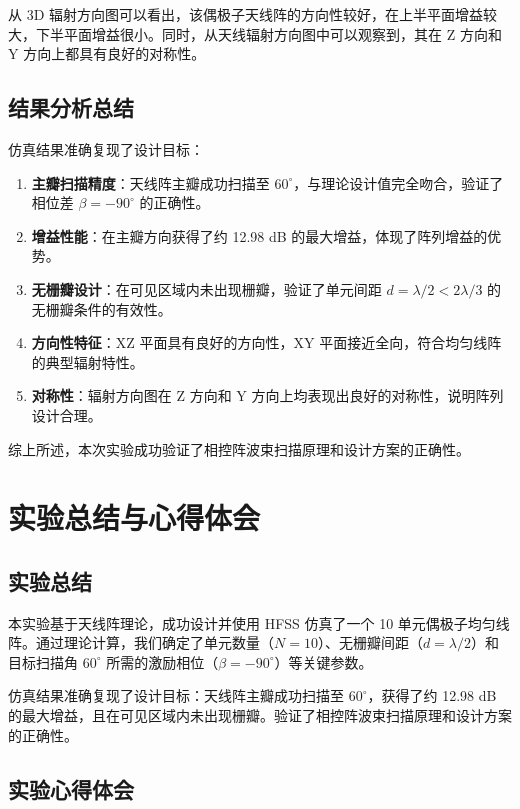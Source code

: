 \documentclass[12pt,a4paper,UTF8]{article}
\begin{document}
从 3D 辐射方向图可以看出，该偶极子天线阵的方向性较好，在上半平面增益较大，下半平面增益很小。同时，从天线辐射方向图中可以观察到，其在 Z 方向和 Y 方向上都具有良好的对称性。

\subsection{结果分析总结}

仿真结果准确复现了设计目标：

\begin{enumerate}
\item \textbf{主瓣扫描精度}：天线阵主瓣成功扫描至 $60^\circ$，与理论设计值完全吻合，验证了相位差 $\beta = -90^\circ$ 的正确性。

\item \textbf{增益性能}：在主瓣方向获得了约 12.98 dB 的最大增益，体现了阵列增益的优势。

\item \textbf{无栅瓣设计}：在可见区域内未出现栅瓣，验证了单元间距 $d = \lambda/2 < 2\lambda/3$ 的无栅瓣条件的有效性。

\item \textbf{方向性特征}：XZ 平面具有良好的方向性，XY 平面接近全向，符合均匀线阵的典型辐射特性。

\item \textbf{对称性}：辐射方向图在 Z 方向和 Y 方向上均表现出良好的对称性，说明阵列设计合理。
\end{enumerate}

综上所述，本次实验成功验证了相控阵波束扫描原理和设计方案的正确性。


\section{实验总结与心得体会}

\subsection{实验总结}

本实验基于天线阵理论，成功设计并使用 HFSS 仿真了一个 10 单元偶极子均匀线阵。通过理论计算，我们确定了单元数量（$N=10$）、无栅瓣间距（$d=\lambda/2$）和目标扫描角 $60^\circ$ 所需的激励相位（$\beta=-90^\circ$）等关键参数。

仿真结果准确复现了设计目标：天线阵主瓣成功扫描至 $60^\circ$，获得了约 12.98 dB 的最大增益，且在可见区域内未出现栅瓣。验证了相控阵波束扫描原理和设计方案的正确性。

\subsection{实验心得体会}
\end{document}
